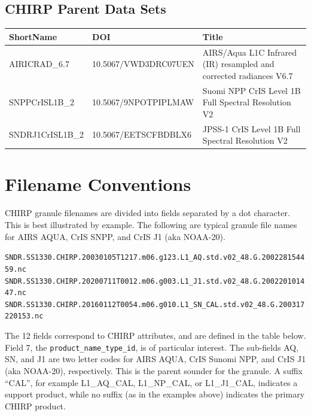 \documentclass[11pt]{article}
\begin{document}
\subsection{CHIRP Parent Data Sets}
{\footnotesize
\begin{center}
\begin{tabular}{|m{3.7cm}|m{4cm}|m{7.3cm}| }
  \hline
  ShortName & DOI & Title \\
  \hline\hline
  AIRICRAD\_6.7 & 10.5067/VWD3DRC07UEN & AIRS/Aqua L1C Infrared (IR)
  resampled and corrected radiances V6.7 \\
  \hline
  SNPPCrISL1B\_2 & 10.5067/9NPOTPIPLMAW & Suomi NPP CrIS Level 1B Full Spectral 
  Resolution V2 \\
  \hline
  SNDRJ1CrISL1B\_2 & 10.5067/EETSCFBDBLX6 & JPSS-1 CrIS Level 1B
  Full Spectral Resolution V2 \\
  \hline
\end{tabular}
\end{center}

\section{Filename Conventions}

CHIRP granule filenames are divided into fields separated by a dot
character.  This is best illustrated by example.  The following are
typical granule file names for AIRS AQUA, CrIS SNPP, and CrIS J1
(aka NOAA-20).

\begin{center}
\texttt{SNDR.SS1330.CHIRP.20030105T1217.m06.g123.L1\_AQ.std.v02\_48.G.200228154459.nc} \\
\texttt{SNDR.SS1330.CHIRP.20200711T0012.m06.g003.L1\_J1.std.v02\_48.G.200220101447.nc} \\
\texttt{SNDR.SS1330.CHIRP.20160112T0054.m06.g010.L1\_SN\_CAL.std.v02\_48.G.200317220153.nc} \\
\end{center}

The 12 fields correspond to CHIRP attributes, and are defined in the
table below.  Field 7, the \texttt{product\_name\_type\_id}, is of
particular interest.  The sub-fields AQ, SN, and J1 are two letter
codes for AIRS AQUA, CrIS Sunomi NPP, and CrIS J1 (aka NOAA-20),
respectively.  This is the parent sounder for the granule.  A suffix
``CAL'', for example L1\_AQ\_CAL, L1\_NP\_CAL, or L1\_J1\_CAL,
indicates a support product, while no suffix (as in the examples
above) indicates the primary CHIRP product.

}
\end{document}
